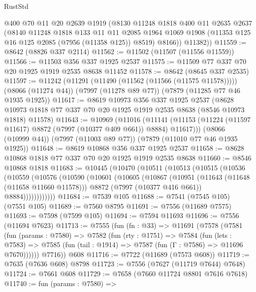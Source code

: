 \begin{lexlean}{RustStd}
\begin{coremodule}
        @400
        @70
        @11
        @20
        @2639
        @1919
        (@8130
          @11248
          @1818
          @400
          @11
          @2635
          @2637
          (@8140
            @11248
            @1818
            @133
            @11
            @11
            @2085
            @1964
            @1069
            @1908
            (@11353 @125 @16 @125 @2085 (@7956 (@11358 @125)) @8519)
            @8166))
        @11382))
@11559 := @8642 (@8826 @337 @2114)
@11562 := @11502 (@11507 (@11556 @11559))
@11566 := @11503 @356 @337 @1925 @2537
@11575 := @11509 @77 @337 @70 @20 @1925 @1919 @2535 @8638 @11452
@11578 := @8642 (@8645 @337 @2535)
@11597 := @11242
    (@11291 (@11490 (@11562 (@11566 (@11575 @11578)))))
    (@8066 (@11274 @44))
    (@7997 (@11278 @89 @77))
    (@7879 (@11285 @77 @46 @1935 @1925))
@11617 := @8619
    @10973
    @356
    @337
    @1925
    @2537
    (@8628 @10973 @1818 @77 @337 @70 @20 @1925 @1919 @2535 @8638 (@8546 @10973 @1818) @11578)
@11643 := @10969
    (@11016
      (@11141 (@11153 (@11224 (@11597 @11617) @8872 (@7997 (@10377 @409 @661)) @8884) @11617)))
    (@8066 (@10999 @44))
    (@7997 (@11003 @89 @77))
    (@7879 (@11010 @77 @46 @1935 @1925))
@11648 := @8619 @10868 @356 @337 @1925 @2537
@11658 := @8628 @10868 @1818 @77 @337 @70 @20 @1925 @1919 @2535 @8638
@11660 := @8546 @10868 @1818
@11683 := @10445
    (@10470
      (@10511
        (@10513
          (@10515
            (@10536
              (@10559
                (@10576
                  (@10590
                    (@10601
                      (@10605
                        (@10867
                          (@10951
                            (@11643 (@11648 (@11658 @11660 @11578)))
                            @8872
                            (@7997 (@10377 @416 @661))
                            @8884))))))))))))
@11684 := @7539 @105
@11688 := @7541 (@7545 @105) (@7551 @105)
@11689 := @7560 @8795
@11691 := @7556 (@11689 @7575)
@11693 := @7598 (@7599 @105)
@11694 := @7594 @11693
@11696 := @7556 (@11694 @7623)
@11713 := @7555
    (fun (fn : @33) =>
    @11691
      (@7578
        (@7581
          (fun (params : @7580) =>
          @7582
            (fun (rty : @1751) =>
            @7584
              (fun (lets : @7583) =>
              @7585 (fun (tail : @1914) => @7587 (fun (Γ : @7586) => @11696 @7670))))))
        @7716))
    @608
@11716 := @7722 (@11689 (@7573 @608))
@11719 := @7635 (@7636 @608) @8798
@11723 := @7556 (@7627 (@11719 @7644) @7648)
@11724 := @7661 @608
@11729 := @7658 (@7660 @11724 @8801 @7616 @7618)
@11740 := fun (params : @7580) =>

\end{coremodule}
\end{lexlean}
